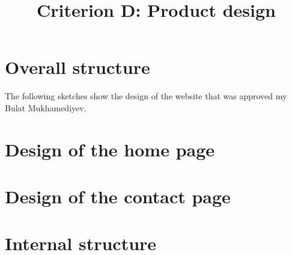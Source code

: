 \documentclass[a4paper]{article}
\title{Criterion D: Product design}
\date{}
\begin{document}
\maketitle

  \section*{Overall structure}

  The following sketches show the design of the website that was approved my Bulat Mukhamediyev.

  \begin{figure}[h]
    \end{figure}
  
  \section*{Design of the home page}

  \section*{Design of the contact page}

  \section*{Internal structure}
\end{document}
